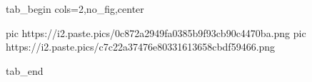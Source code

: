  
 
 
 
 


\ifcmt
  tab_begin cols=2,no_fig,center

     pic https://i2.paste.pics/0c872a2949fa0385b9f93cb90c4470ba.png
		 pic https://i2.paste.pics/c7c22a37476e80331613658cbdf59466.png

  tab_end
\fi

